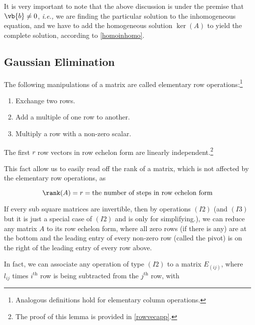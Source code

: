 \documentclass[a4paper,12pt]{report}
\begin{document}
It is very important to note that the above discussion is under the premise that \(\vb{b} \neq 0\), \textit{i.e.,} we are finding the particular solution to the inhomogeneous equation, and we have to add the homogeneous solution \(\ker (A)\) to yield the complete solution, according to \cref{homoinhomo}.   

\subsection{Gaussian Elimination} \label{elim} 

\begin{definition}
The following manipulations of a matrix are called elementary row operations:\footnote{Analogous definitions hold for elementary column operations.}

\begin{enumerate}[label=(\(I\)\arabic*)]
    \item Exchange two rows.
    \item Add a multiple of one row to another.
    \item Multiply a row with a non-zero scalar.
\end{enumerate}

\end{definition}

\begin{lemma} \label{rowvec} 
    The first \(r\) row vectors in row echelon form are linearly independent.\footnote{The proof of this lemma is provided in \cref{rowvecapp}.}
    \end{lemma}
    
This fact allow us to easily read off the rank of a matrix, which is not affected by the elementary row operations, as

\begin{equation}
    \rank (A) = r = \text{the number of steps in row echelon form}
\end{equation}

If every sub square matrices are invertible, then by operations \((I2)\) (and \((I3)\) but it is just a special case of \((I2)\) and is only for simplifying.), we can reduce any matrix \(A\) to its row echelon form,  where all zero rows (if there is any) are at the bottom and the leading entry of every non-zero row (called the pivot) is on the right of the leading entry of every row above. 

In fact, we can associate any operation of type \((I2)\) to a matrix \(E_{(ij)} \), where \(l_{ij} \) times \(i^{\text{th}} \) row is being subtracted from the \(j^{\text{th}} \) row, with 
\end{document}
